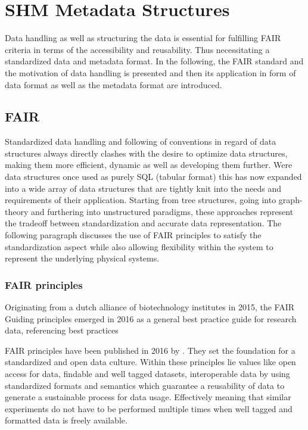 \newpage


\section{SHM Metadata Structures}

Data handling as well as structuring the data is essential for fulfilling FAIR criteria in terms of the accessibility and reusability. Thus necessitating a standardized data and metadata format. In the following, the FAIR standard and the motivation of data handling is presented and then its application in form of data format as well as the metadata format are introduced.

\subsection{FAIR}

Standardized data handling and following of conventions in regard of data structures always directly clashes with the desire to optimize data structures, making them more efficient, dynamic as well as developing them further. Were data structures once used as purely SQL (tabular format) this has now expanded into a wide array of data structures that are tightly knit into the needs and requirements of their application. Starting from tree structures, going into graph-theory and furthering into unstructured paradigms, these approaches represent the tradeoff between standardization and accurate data representation. The following paragraph discusses the use of FAIR principles to satisfy the standardization aspect while also allowing flexibility within the system to represent the underlying physical systems.

\subsubsection{FAIR principles}

Originating from a dutch alliance of biotechnology institutes in 2015, the FAIR Guiding principles emerged in 2016 as a general best practice guide for research data, referencing best practices

FAIR principles have been published in 2016 by \textcite{wilkinson_fair_2016}. They set the foundation for a standardized and open data culture. Within these principles lie values like open access for data, findable and well tagged datasets, interoperable data by using standardized formats and semantics which guarantee a reusability of data to generate a sustainable process for data usage. Effectively meaning that similar experiments do not have to be performed multiple times when well tagged and formatted data is freely available.

